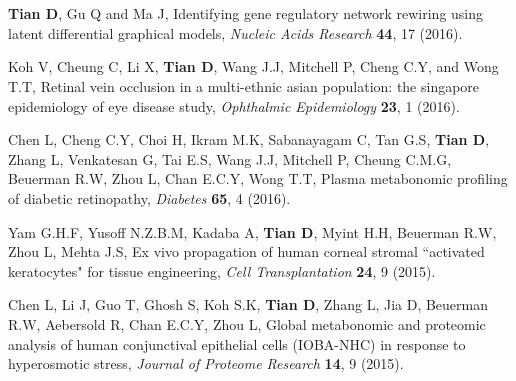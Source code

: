 \documentclass[paper=letter,fontsize=11pt]{scrartcl} %
\newcommand{\NewPart}[2]{\section*{\capitalisewords{#1} #2}}
\newcommand{\PaperEntry}[7]{
		\noindent #1, #2, \textit{#3} \textbf{#4}, #5 (#6).}
\begin{document}
\NewPart{Publications}{}
\begin{etaremune}
\item \PaperEntry{\textbf{Tian D}, Gu Q and Ma J}{Identifying gene regulatory network rewiring using latent differential graphical models}{Nucleic Acids Research}{44}{17}{2016}{https://academic.oup.com/nar/article/44/17/e140/2468041}  
\item \PaperEntry{Koh V, Cheung C, Li X, \textbf{Tian D}, Wang J.J, Mitchell P, Cheng C.Y, and Wong T.T}{Retinal vein occlusion in a multi-ethnic asian population: the singapore epidemiology of eye disease study}{Ophthalmic Epidemiology}{23}{1}{2016}{https://www.tandfonline.com/doi/abs/10.3109/09286586.2015.1082604}
\item \PaperEntry{Chen L, Cheng C.Y, Choi H, Ikram M.K, Sabanayagam C, Tan G.S, \textbf{Tian D}, Zhang L, Venkatesan G, Tai E.S, Wang J.J, Mitchell P, Cheung C.M.G, Beuerman R.W, Zhou L, Chan E.C.Y, Wong T.T}{Plasma metabonomic profiling of diabetic retinopathy}{Diabetes}{65}{4}{2016}{http://diabetes.diabetesjournals.org/content/early/2016/01/14/db15-0661.short}
\item \PaperEntry{Yam G.H.F, Yusoff N.Z.B.M, Kadaba A, \textbf{Tian D}, Myint H.H,  Beuerman R.W, Zhou L, Mehta J.S}{Ex vivo propagation of human corneal stromal ``activated keratocytes" for tissue engineering}{Cell Transplantation}{24}{9}{2015}{https://www.ingentaconnect.com/content/cog/ct/2015/00000024/00000009/art00013}
\item \PaperEntry{Chen L, Li J, Guo T, Ghosh S, Koh S.K, \textbf{Tian D}, Zhang L, Jia D, Beuerman R.W, Aebersold R, Chan E.C.Y, Zhou L}{Global metabonomic and proteomic analysis of human conjunctival epithelial cells (IOBA-NHC) in response to hyperosmotic stress}{Journal of Proteome Research}{14}{9}{2015}{https://pubs.acs.org/doi/abs/10.1021/acs.jproteome.5b00443}

\end{etaremune}
\end{document}
